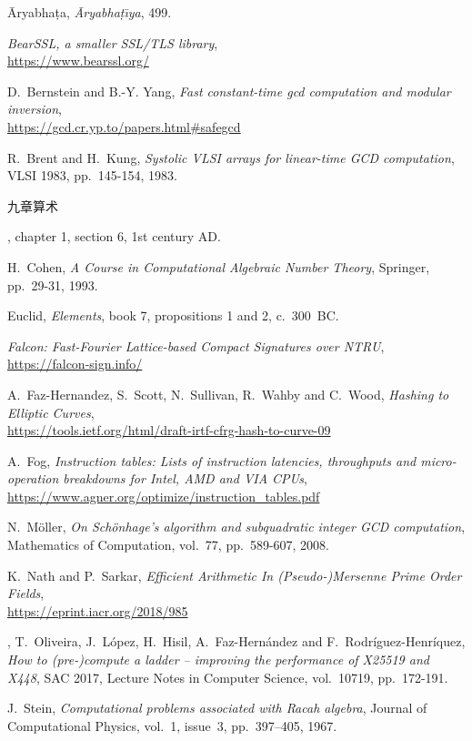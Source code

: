 \documentclass{llncs}
\begin{document}
\begin{thebibliography}{20}

\={A}ryabha\d{t}a,
\emph{\={A}ryabha\d{t}\={\i}ya}, 499.

\emph{BearSSL, a smaller SSL/TLS library},\\
\url{https://www.bearssl.org/}

D.~Bernstein and B.-Y. Yang,
\emph{Fast constant-time gcd computation and modular inversion},\\
\url{https://gcd.cr.yp.to/papers.html#safegcd}

R.~Brent and H.~Kung,
\emph{Systolic VLSI arrays for linear-time GCD computation},
VLSI 1983, pp.~145-154, 1983.

\begin{CJK*}{UTF8}{gbsn}九章算术\end{CJK*}, chapter 1, section 6,
1st century AD.

H.~Cohen,
\emph{A Course in Computational Algebraic Number Theory},
Springer, pp.~29-31, 1993.

Euclid,
\emph{Elements}, book 7, propositions 1 and 2, c.~300~BC.

\emph{Falcon: Fast-Fourier Lattice-based Compact Signatures over NTRU},\\
\url{https://falcon-sign.info/}

A.~Faz-Hernandez, S.~Scott, N.~Sullivan, R.~Wahby and C.~Wood,
\emph{Hashing to Elliptic Curves},\\
\url{https://tools.ietf.org/html/draft-irtf-cfrg-hash-to-curve-09}

A.~Fog,
\emph{Instruction tables: Lists of instruction latencies, throughputs
and micro-operation breakdowns for Intel, AMD and VIA CPUs},\\
\url{https://www.agner.org/optimize/instruction_tables.pdf}

N.~Möller,
\emph{On Schönhage's algorithm and subquadratic integer GCD computation},
Mathematics of Computation, vol.~77, pp.~589-607, 2008.

K.~Nath and P.~Sarkar,
\emph{Efficient Arithmetic In (Pseudo-)Mersenne Prime Order Fields},\\
\url{https://eprint.iacr.org/2018/985}

,
T.~Oliveira, J.~López, H.~Hisil, A.~Faz-Hernández and F.~Rodríguez-Henríquez,
\emph{How to (pre-)compute a ladder -- improving the performance of
X25519 and X448}, SAC 2017, Lecture Notes in Computer Science,
vol.~10719, pp.~172-191.

J.~Stein,
\emph{Computational problems associated with Racah algebra},
Journal of Computational Physics, vol.~1, issue~3, pp.~397–405, 1967.

\end{thebibliography}
\end{document}
